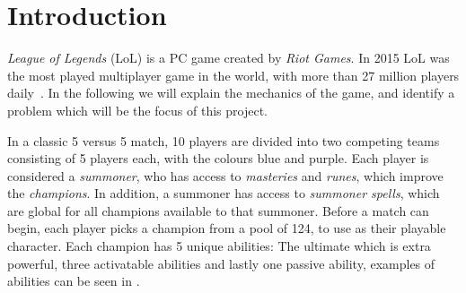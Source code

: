 \section{Introduction}\label{sec:intro}



\emph{League of Legends} (LoL) is a PC game created by \emph{Riot Games}. In  2015 LoL was the most played multiplayer game in the world, with more than 27 million players daily~\cite{LoL27mill,LoLmostplayed}. 
In the following we will explain the mechanics of the game, and identify a problem which will be the focus of this project. 

In a classic 5 versus 5 match, 10 players are divided into two competing teams consisting of 5 players each, with the colours blue and purple. Each player is considered a \emph{summoner}, who has access to \emph{masteries} and \emph{runes}, which improve the \emph{champions}. In addition, a summoner has access to \emph{summoner spells}, which are global for all champions available to that summoner. Before a match can begin, each player picks a champion from a pool of 124, to use as their playable character. Each champion has 5 unique abilities: The ultimate which is extra powerful, three activatable abilities and lastly one passive ability, examples of abilities can be seen in .

